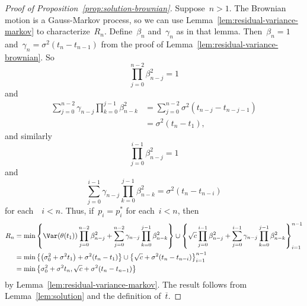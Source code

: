 \begin{proof}[Proof of Proposition~\ref{prop:solution-brownian}]
    Suppose~$n>1$.
    The Brownian motion is a Gauss-Markov process, so we can use Lemma~\ref{lem:residual-variance-markov} to characterize~$R_n$.
    Define~$\beta_n$ and~$\gamma_n$ as in that lemma.
    Then~$\beta_n=1$ and~$\gamma_n=\sigma^2(t_n-t_{n-1})$ from the proof of Lemma~\ref{lem:residual-variance-brownian}.
    So
    \[ \prod_{j=0}^{n-2}\beta_{n-j}^2=1 \]
    and
    \begin{align*}
        \sum_{j=0}^{n-2}\gamma_{n-j}\prod_{k=0}^{j-1}\beta_{n-k}^2
        &= \sum_{j=0}^{n-2}\sigma^2(t_{n-j}-t_{n-j-1}) \\
        &= \sigma^2(t_n-t_1),
    \end{align*}
    and similarly
    \[ \prod_{j=0}^{i-1}\beta_{n-j}^2=1 \]
    and
    \[ \sum_{j=0}^{i-1}\gamma_{n-j}\prod_{k=0}^{j-1}\beta_{n-k}^2=\sigma^2(t_n-t_{n-i}) \]
    for each~~$i<n$.
    Thus, if~$p_i=p_i^*$ for each~$i<n$, then
    \begin{align*}
        R_n
        &= \min\left\{\Var(\theta(t_1))\prod_{j=0}^{n-2}\beta_{n-j}^2+\sum_{j=0}^{n-2}\gamma_{n-j}\prod_{k=0}^{j-1}\beta_{n-k}^2\right\}\cup\left\{\sqrt{c}\prod_{j=0}^{i-1}\beta_{n-j}^2+\sum_{j=0}^{i-1}\gamma_{n-j}\prod_{k=0}^{j-1}\beta_{n-k}^2\right\}_{i=1}^{n-1} \\
        &= \min\left\{\left(\sigma_0^2+\sigma^2t_1\right)+\sigma^2(t_n-t_1)\right\}\cup\left\{\sqrt{c}+\sigma^2(t_n-t_{n-i})\right\}_{i=1}^{n-1} \\
        &= \min\left\{\sigma_0^2+\sigma^2t_n,\sqrt{c}+\sigma^2(t_n-t_{n-1})\right\}
    \end{align*}
    by Lemma~\ref{lem:residual-variance-markov}.
    The result follows from Lemma~\ref{lem:solution} and the definition of~$\overline{t}$.
\end{proof}
